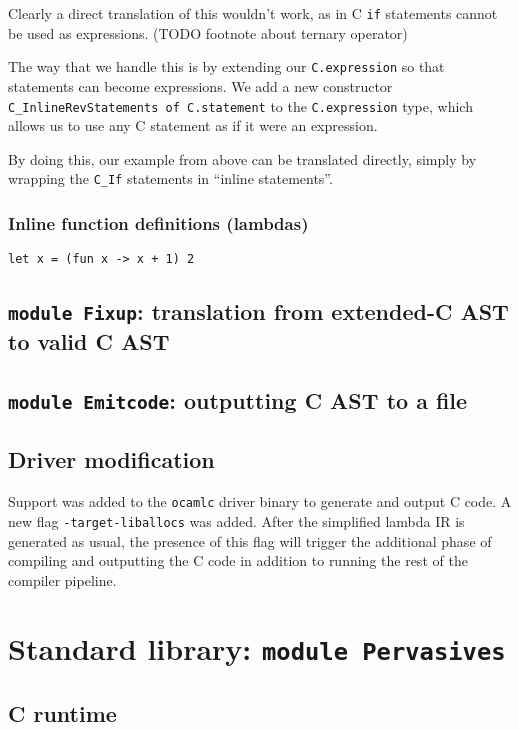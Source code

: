 \documentclass[12pt,a4paper,twoside,openright]{report}
\begin{document}
Clearly a direct translation of this wouldn't work, as in C \lstinline!if! statements cannot be used as expressions. (TODO footnote about ternary operator)

The way that we handle this is by extending our \lstinline!C.expression! so
that statements can become expressions.  We add a new constructor
\lstinline!C_InlineRevStatements of C.statement! to the
\lstinline!C.expression! type, which allows us to use any C statement as if it
were an expression.

By doing this, our example from above can be translated directly, simply by wrapping the \lstinline!C_If! statements in ``inline statements''.

\subsubsection{Inline function definitions (lambdas)}

\begin{lstlisting}
let x = (fun x -> x + 1) 2
\end{lstlisting}

\subsection{\texttt{module Fixup}: translation from extended-C AST to valid C AST}

\subsection{\texttt{module Emitcode}: outputting C AST to a file}

\subsection{Driver modification}

Support was added to the \lstinline!ocamlc! driver binary to generate and output C code. A new flag \lstinline!-target-liballocs! was added. After the simplified lambda IR is generated as usual, the presence of this flag will trigger the additional phase of compiling and outputting the C code in addition to running the rest of the compiler pipeline.

\section{Standard library: \texttt{module Pervasives}}

\subsection{C runtime}
\end{document}
